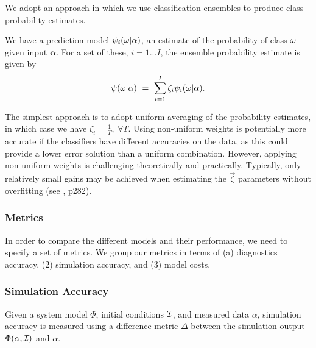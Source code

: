 We adopt an approach in which we use classification ensembles to produce class probability estimates. 
\begin{definition}
We have a prediction model $\psi_i(\omega|\mathbf{\alpha})$, an estimate of the probability of class $\omega$ given input $\mathbf{\alpha}$. For a set of these, $i = {1...I}$, the ensemble probability estimate is given by
\begin{equation}
\relax{\psi}(\omega|\mathbf{\alpha})~=~\sum_{i=1}^I \zeta_i  \psi_i(\omega|\mathbf{\alpha}).
\end{equation}
\end{definition}

The simplest approach is to adopt uniform averaging of the probability estimates, in which case we have $\zeta_i = \frac{1}{T}, ~\forall T$.
Using non-uniform weights is potentially more accurate if the classifiers have different accuracies on the data, as this could provide a lower error solution than a uniform combination.
However, applying non-uniform weights is challenging theoretically and practically.
Typically, only relatively small gains may be achieved when estimating the $\vec{\zeta}$ parameters without overfitting (see \citep{kuncheva2004combining}, p282).


\subsubsection{Metrics}


In order to compare the different models and their performance, we need to specify a set of metrics. We group our metrics in terms of (a) diagnostics accuracy, (2) simulation accuracy, and (3) model costs.

\subsubsection{Simulation Accuracy}

\begin{definition}
Given a system model $\Phi$, 
initial conditions $\cal I$, and measured data $\alpha$, simulation accuracy is measured using a difference metric $\Delta$ between the simulation output $\Phi(\alpha, {\cal I})$ and $\alpha$.
\end{definition}

